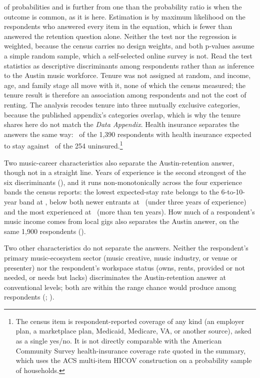 {of probabilities and is further from one than the probability ratio is
when the outcome is common, as it is here. Estimation is by maximum
likelihood on the respondents who answered every item in the equation, which
is fewer than answered the retention question alone. Neither the test nor the
regression is weighted, because the census carries no design weights, and
both p-values assume a simple random sample, which a self-selected online
survey is not. Read the test statistics as descriptive discriminants among
respondents rather than as inference to the Austin music workforce.
Tenure was not assigned at random, and income, age, and family stage all
move with it, none of which the census measured; the tenure result is
therefore an association among respondents and not the cost of renting.
The analysis recodes tenure into three mutually exclusive categories, because
the published appendix's categories overlap, which is why the tenure shares
here do not match the \textit{Data Appendix}.} Health insurance separates the
answers the same way: \NCensusStayHealthInsuranceHasHealthInsurance\ of the
1,390 respondents with health insurance expected to stay against
\NCensusStayHealthInsuranceNoHealthInsurance\ of the 254
uninsured.\footnote{The census item is respondent-reported coverage of any
kind (an employer plan, a marketplace plan, Medicaid, Medicare, VA, or
another source), asked as a single yes/no. It is not directly comparable with
the American Community Survey health-insurance coverage rate quoted in the
summary, which uses the ACS multi-item HICOV construction on a probability
sample of households.}

Two music-career characteristics also separate the Austin-retention answer,
though not in a straight line. Years of experience is the second strongest of
the six discriminants (\NCensusStaychiTwoYearsOfExperience), and it runs
non-monotonically across the four experience bands the census reports: the
lowest expected-stay rate belongs to the 6-to-10-year band at
\NCensusStayYearsOfExperienceSixToOneZeroYears, below both newer entrants at
\NCensusStayYearsOfExperienceUnderThreeYears\ (under three years of
experience) and the most experienced at
\NCensusStayYearsOfExperienceMoreThanOneZeroYears\ (more than ten years). How
much of a respondent's music income comes from local gigs also separates the
Austin answer, on the same 1,900 respondents
(\NCensusStaychiTwoMusicIncomeFromLocalGigs).

Two other characteristics do not separate the answers. Neither the
respondent's primary music-ecosystem sector (music creative, music industry,
or venue or presenter) nor the respondent's workspace status (owns, rents,
provided or not needed, or needs but lacks) discriminates the Austin-retention
answer at conventional levels; both are within the range chance would
produce among respondents
(\NCensusStaychiTwoPrimarySector; \NCensusStaychiTwoWorkSpaceStatus).

